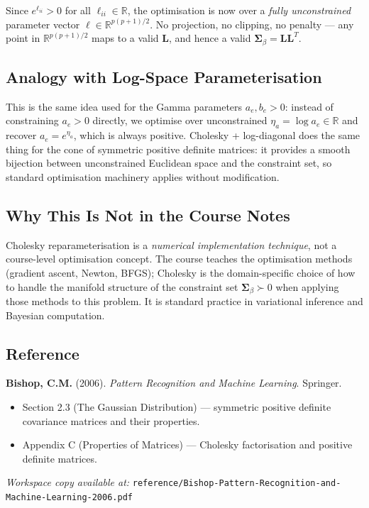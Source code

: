 \documentclass[11pt]{article}
\newcommand{\R}{\mathbb{R}}
\begin{document}
Since $e^{\ell_{ii}} > 0$ for all $\ell_{ii} \in \R$, the optimisation is now over a \emph{fully unconstrained} parameter vector $\bm{\ell} \in \R^{p(p+1)/2}$. No projection, no clipping, no penalty --- any point in $\R^{p(p+1)/2}$ maps to a valid $\bm{L}$, and hence a valid $\bm{\Sigma}_\beta = \bm{L}\bm{L}^T$.

\subsection*{Analogy with Log-Space Parameterisation}

This is the same idea used for the Gamma parameters $a_e, b_e > 0$: instead of constraining $a_e > 0$ directly, we optimise over unconstrained $\eta_a = \log a_e \in \R$ and recover $a_e = e^{\eta_a}$, which is always positive. Cholesky + log-diagonal does the same thing for the cone of symmetric positive definite matrices: it provides a smooth bijection between unconstrained Euclidean space and the constraint set, so standard optimisation machinery applies without modification.

\subsection*{Why This Is Not in the Course Notes}

Cholesky reparameterisation is a \emph{numerical implementation technique}, not a course-level optimisation concept. The course teaches the optimisation methods (gradient ascent, Newton, BFGS); Cholesky is the domain-specific choice of how to handle the manifold structure of the constraint set $\bm{\Sigma}_\beta \succ 0$ when applying those methods to this problem. It is standard practice in variational inference and Bayesian computation.

\subsection*{Reference}

\noindent\textbf{Bishop, C.M.} (2006). \textit{Pattern Recognition and Machine Learning}. Springer.
\begin{itemize}
  \item Section 2.3 (The Gaussian Distribution) --- symmetric positive definite covariance matrices and their properties.
  \item Appendix C (Properties of Matrices) --- Cholesky factorisation and positive definite matrices.
\end{itemize}
\noindent\textit{Workspace copy available at:} \texttt{reference/Bishop-Pattern-Recognition-and-Machine-Learning-2006.pdf}
\end{document}
